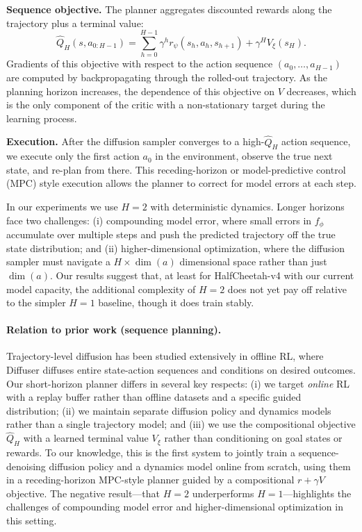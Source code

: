 \documentclass{article}
\theoremstyle{plain}
\theoremstyle{definition}
\theoremstyle{remark}
\newcommand{\Q}{\hat{Q}}
\begin{document}
\textbf{Sequence objective.}
The planner aggregates discounted rewards along the trajectory plus a terminal value:
\begin{equation}
  \Q_H(s, a_{0:H-1}) = \sum_{h=0}^{H-1} \gamma^h r_\psi(s_h, a_h, s_{h+1}) + \gamma^H V_\xi(s_H).
  \label{eq:J-seq}
\end{equation}
Gradients of this objective with respect to the action sequence $(a_0, \dots, a_{H-1})$ are computed by backpropagating through the rolled-out trajectory. As the planning horizon increases, the dependence of this objective on $V$ decreases, which is the only component of the critic with a non-stationary target during the learning process.

\textbf{Execution.}
After the diffusion sampler converges to a high-$\Q_H$ action sequence, we execute only the first action $a_0$ in the environment, observe the true next state, and re-plan from there.
This receding-horizon or model-predictive control (MPC) style execution allows the planner to correct for model errors at each step.

In our experiments we use $H=2$ with deterministic dynamics.
Longer horizons face two challenges: (i) compounding model error, where small errors in $f_\phi$ accumulate over multiple steps and push the predicted trajectory off the true state distribution; and (ii) higher-dimensional optimization, where the diffusion sampler must navigate a $H \times \dim(a)$ dimensional space rather than just $\dim(a)$.
Our results suggest that, at least for HalfCheetah-v4 with our current model capacity, the additional complexity of $H=2$ does not yet pay off relative to the simpler $H=1$ baseline, though it does train stably.

\paragraph{Relation to prior work (sequence planning).}
Trajectory-level diffusion has been studied extensively in offline RL, where Diffuser \citep{janner2022diffuser} diffuses entire state-action sequences and conditions on desired outcomes.
Our short-horizon planner differs in several key respects: (i) we target \emph{online} RL with a replay buffer rather than offline datasets and a specific guided distribution; (ii) we maintain separate diffusion policy and dynamics models rather than a single trajectory model; and (iii) we use the compositional objective $\Q_H$ with a learned terminal value $V_\xi$ rather than conditioning on goal states or rewards.
To our knowledge, this is the first system to jointly train a sequence-denoising diffusion policy and a dynamics model online from scratch, using them in a receding-horizon MPC-style planner guided by a compositional $r+\gamma V$ objective.
The negative result---that $H=2$ underperforms $H=1$---highlights the challenges of compounding model error and higher-dimensional optimization in this setting.
\end{document}
